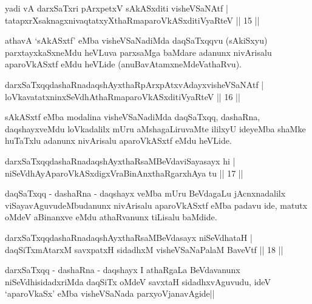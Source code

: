 
\begin{shl}
yadi vA darxSaTxri pArxpetxV sAkASxditi visheVSaNAtf |\\
tatapxrXsaknagxnivaqtatxyXthaRmaparoVkASxditiVyaRteV \hfill || 15 ||
\end{shl}

\begin{artha}
athavA `sAkASxtf' eMba visheVSaNadiMda daqSaTxqqvu (sAkiSxyu) parxtayxkaSxneMdu heVLuva parxsaMga baMdare adanunx nivArisalu aparoVkASxtf eMdu heVLide (anuBavAtamxneMdeVathaRvu).
\end{artha}


\begin{shl}
darxSaTxqqdashaRnadaqshAyxthaRpArxpAtxvAdayxvisheVSaNAtf |\\
loVkavatatxninxSeVdhAthaRmaparoVkASxditiVyaRteV \hfill || 16 ||
\end{shl}

\begin{artha}
sAkASxtf eMba modalina visheVSaNadiMda daqSaTxqq, dashaRna, daqshayxveMdu loVkadalilx mUru aMshagaLiruvaMte ililxyU ideyeMba shaMke huTaTxlu adanunx nivArisalu aparoVkASxtf eMdu heVLide.
\end{artha}

\begin{shl}
darxSaTxqqdashaRnadaqshAyxthaRsaMBeVdaviSayasayx hi |\\
niSeVdhAyAparoVkASxdigxVraBinAnxthaRgarxhAya tu \hfill || 17 ||
\end{shl}

\begin{artha}
daqSaTxqq - dashaRna - daqshayx veMba mUru BeVdagaLu jAcnxnadalilx  viSayavAguvudeMbudanunx nivArisalu aparoVkASxtf eMba padavu ide, matutx oMdeV aBinanxve eMdu athaRvanunx tiLisalu baMdide.
\end{artha}


\begin{shl}
darxSaTxqqdashaRnadaqshAyxthaRsaMBeVdasayx niSeVdhataH |\\
daqSiTxmAtarxM savxpatxH sidadhxM visheVSaNaPalaM BaveVtf \hfill || 18 ||
\end{shl}

\begin{artha}
darxSaTxqq - dashaRna - daqshayx I athaRgaLa BeVdavanunx niSeVdhisidadxriMda daqSiTx oMdeV savxtaH sidadhxvAguvudu, ideV `aparoVkaSx' eMba visheVSaNada parxyoVjanavAgide||
\end{artha}

